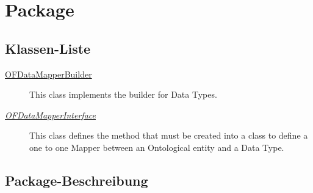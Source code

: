 
\chapter[Package ontologyFramework.OFDataMapping]{Package }\label{ontologyFramework.OFDataMapping-package}



\section{Klassen-Liste}
\begin{description}
\item[{\hyperlink{ontologyFramework.OFDataMapping.OFDataMapperBuilder-class}{OFDataMapperBuilder}}]
This class implements the builder for Data Types.
\hfill\pageref{ontologyFramework.OFDataMapping.OFDataMapperBuilder-class}

\item[{\textit{\hyperlink{ontologyFramework.OFDataMapping.OFDataMapperInterface<OntoEntity extends org.semanticweb.owlapi.model.OWLObject, R>-class}{OFDataMapperInterface}}}]
This class defines the method that must be created into
 a class to define a one to one Mapper between an Ontological entity and
 a Data Type.
\hfill\pageref{ontologyFramework.OFDataMapping.OFDataMapperInterface<OntoEntity extends org.semanticweb.owlapi.model.OWLObject, R>-class}

\end{description}
\section{Package-Beschreibung}



